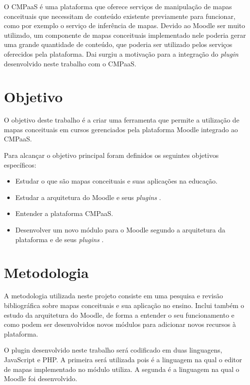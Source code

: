 \documentclass[
	12pt,				%
	openright,			%
	oneside,			%
	a4paper,			%
	english,			%
	french,				%
	spanish,			%
	brazil				%
	]{abntex2}
\begin{document}
O CMPaaS é uma plataforma que oferece serviços de manipulação de mapas conceituais que necessitam de conteúdo existente previamente para funcionar, como por exemplo o serviço de inferência de mapas. Devido ao Moodle ser muito utilizado, um componente de mapas conceituais implementado nele poderia gerar uma grande quantidade de conteúdo, que poderia ser utilizado pelos serviços oferecidos pela plataforma. Dai surgiu a motivação para a integração do \textit{plugin} desenvolvido neste trabalho com o CMPaaS.

\section{Objetivo}

O objetivo deste trabalho é a criar uma ferramenta que permite a utilização de mapas conceituais em cursos gerenciados pela plataforma Moodle integrado ao CMPaaS.

Para alcançar o objetivo principal foram definidos os seguintes objetivos específicos:

\begin{itemize}
	\item Estudar o que são mapas conceituais e suas aplicações na educação.
	\item Estudar a arquitetura do Moodle e seus \textit{plugins} .
	\item Entender a plataforma CMPaaS.
	\item Desenvolver um novo módulo para o Moodle segundo a arquitetura da plataforma e de seus \textit{plugins} .   
\end{itemize} 



\section{Metodologia}

A metodologia utilizada neste projeto consiste em uma pesquisa e revisão bibliográfica sobre mapas conceituais e sua aplicação no ensino. Inclui também o estudo da arquitetura do Moodle, de forma a entender o seu funcionamento e como podem ser desenvolvidos novos módulos para adicionar novos recursos à plataforma.

O plugin desenvolvido neste trabalho será codificado em duas linguagens, JavaScript e PHP. A primeira será utilizada pois é a linguagem na qual o editor de mapas implementado no módulo utiliza. A segunda é a linguagem na qual o Moodle foi desenvolvido.  
\end{document}
